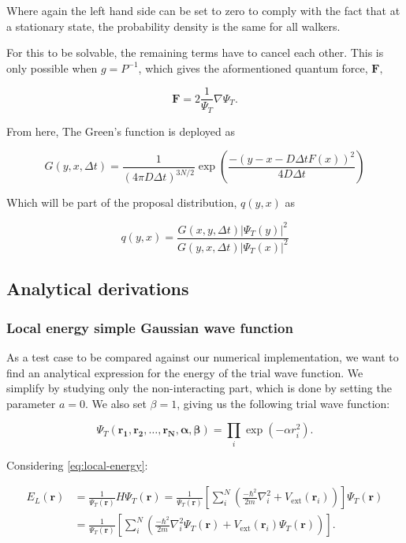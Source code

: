 \documentclass[
]{article}
\begin{document}
Where again the left hand side can be set to zero to comply with the
fact that at a stationary state, the probability density is the same for
all walkers.

For this to be solvable, the remaining terms have to cancel each other.
This is only possible when \(g = P^{-1}\), which gives the aformentioned
quantum force, \(\mathbf{F},\)

\[ \mathbf{F}=2 \frac{1}{\Psi_{T}} \nabla \Psi_{T}. \]

From here, The Green's function is deployed as

\[ G(y, x, \Delta t)=\frac{1}{(4 \pi D \Delta t)^{3 N / 2}} \exp \left(\frac{-(y-x-D \Delta t F(x))^{2}}{ 4 D \Delta t}\right) \]

Which will be part of the proposal distribution, \(q(y,x)\) as

\begin{equation} q(y, x)=\frac{G(x, y, \Delta t)\left|\Psi_{T}(y)\right|^{2}}{G(y, x, \Delta t)\left|\Psi_{T}(x)\right|^{2}}\label{eq:proposal_distr}\end{equation}

\hypertarget{analytical-derivations}{%
\subsection{Analytical derivations}\label{analytical-derivations}}

\hypertarget{local-energy-simple-gaussian-wave-function}{%
\subsubsection{Local energy simple Gaussian wave
function}\label{local-energy-simple-gaussian-wave-function}}

As a test case to be compared against our numerical implementation, we
want to find an analytical expression for the energy of the trial wave
function. We simplify by studying only the non-interacting part, which
is done by setting the parameter \(a = 0\). We also set \(\beta = 1\),
giving us the following trial wave function:

\[\Psi_T(\mathbf{r_1, r_2,\ldots,r_N, \alpha, \beta}) = \prod_i \exp(-\alpha r_{i}^2).\]

Considering \eqref{eq:local-energy}:

\begin{align*}
E_L(\mathbf{r}) &=  \frac{1}{\Psi_T (\mathbf{r})} H \Psi_T (\mathbf{r})
= \frac{1}{\Psi_T (\mathbf{r})} \left[ \sum_i^N \left( \frac{-\hbar^2}{2m}
   \nabla_{i}^2 + V_{\text{ext}}({\mathbf{r}}_i)\right)  \right]\Psi_T(\mathbf{r}) \\
&= \frac{1}{\Psi_T(\mathbf{r})} \left[ \sum_i^N \left (\frac{-\hbar^2}{2m}
  \nabla_{i}^2 \Psi_T (\mathbf{r}) + V_\text{ext} ({\mathbf{r}}_i) \Psi_T(\mathbf{r}) \right) \right].
\end{align*}
\end{document}
